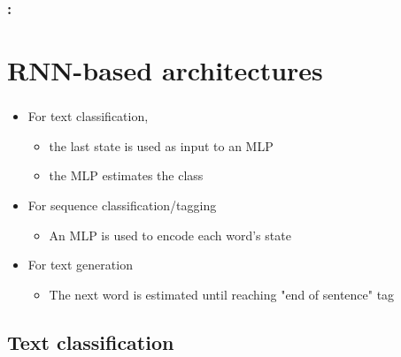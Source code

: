 \documentclass[xcolor=table]{beamer}
\begin{document}
\begin{frame}
	\frametitle{\insertshortsubtitle: \insertsection}
	\framesubtitle{\insertsubsection}
	
	
\end{frame}


\section{RNN-based architectures}

\begin{frame}
	\frametitle{\insertshortsubtitle}
	\framesubtitle{\insertsection}
	
	\begin{itemize}
		\item For text classification, 
		\begin{itemize}
			\item the last state is used as input to an MLP
			\item the MLP estimates the class
		\end{itemize}
		\item For sequence classification/tagging
		\begin{itemize}
			\item An MLP is used to encode each word's state
		\end{itemize}
		\item For text generation
		\begin{itemize}
			\item The next word is estimated until reaching "end of sentence" tag
		\end{itemize}
	\end{itemize}
	
\end{frame}

\subsection{Text classification}
\end{document}
